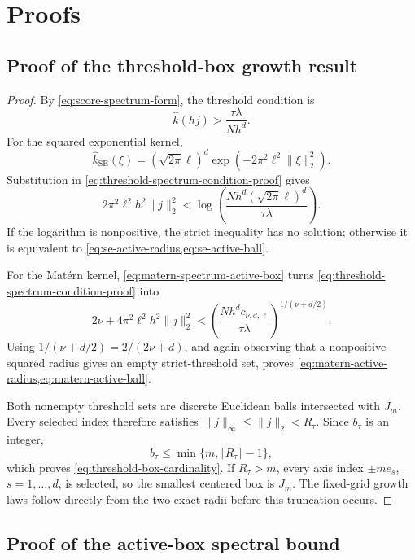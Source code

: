 \section{Proofs}
\label{app:proofs}

\subsection{Proof of the threshold-box growth result}

\begin{proof}
By \cref{eq:score-spectrum-form}, the threshold condition is
\begin{equation}
    \widehat k(hj)>\frac{\tau\lambda}{Nh^d}.
    \label{eq:threshold-spectrum-condition-proof}
\end{equation}
For the squared exponential kernel,
\[
    \widehat k_{\mathrm{SE}}(\xi)
    =(\sqrt{2\pi}\ell)^d
    \exp\!\left(-2\pi^2\ell^2\|\xi\|_2^2\right).
\]
Substitution in \cref{eq:threshold-spectrum-condition-proof} gives
\[
    2\pi^2\ell^2h^2\|j\|_2^2
    <\log\!\left(
        \frac{Nh^d(\sqrt{2\pi}\ell)^d}{\tau\lambda}
    \right).
\]
If the logarithm is nonpositive, the strict inequality has no solution;
otherwise it is equivalent to
\cref{eq:se-active-radius,eq:se-active-ball}.

For the Mat\'ern kernel, \cref{eq:matern-spectrum-active-box} turns
\cref{eq:threshold-spectrum-condition-proof} into
\[
    2\nu+4\pi^2\ell^2h^2\|j\|_2^2
    <\left(
        \frac{Nh^dc_{\nu,d,\ell}}{\tau\lambda}
    \right)^{1/(\nu+d/2)}.
\]
Using \(1/(\nu+d/2)=2/(2\nu+d)\), and again observing that a
nonpositive squared radius gives an empty strict-threshold set, proves
\cref{eq:matern-active-radius,eq:matern-active-ball}.

Both nonempty threshold sets are discrete Euclidean balls intersected with
\(J_m\). Every selected index therefore satisfies
\(\|j\|_\infty\leq\|j\|_2<R_\tau\). Since \(b_\tau\) is an integer,
\[
    b_\tau\leq\min\{m,\lceil R_\tau\rceil-1\},
\]
which proves \cref{eq:threshold-box-cardinality}. If \(R_\tau>m\), every
axis index \(\pm m e_s\), \(s=1,\ldots,d\), is selected, so the smallest
centered box is \(J_m\). The fixed-grid growth laws follow directly from the
two exact radii before this truncation occurs.
\end{proof}

\subsection{Proof of the active-box spectral bound}

